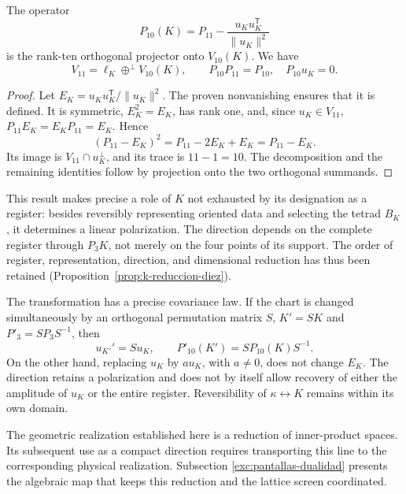 \begin{proposition}
\label{prop:k-reduccion-diez}
The operator
\begin{equation}
 P_{10}(K)=P_{11}
       -\frac{u_Ku_K^{\mathsf T}}{\lVert u_K\rVert^2}
 \label{eq:k-proyector-diez}
\end{equation}
is the rank-ten orthogonal projector onto \(V_{10}(K)\). We have
\[
 V_{11}=\ell_K\mathbin{\oplus^{\perp}}V_{10}(K),
 \qquad P_{10}P_{11}=P_{10},\quad P_{10}u_K=0.
\]
\end{proposition}
\begin{proof}
Let \(E_K=u_Ku_K^{\mathsf T}/\lVert u_K\rVert^2\). The
proven nonvanishing ensures that it is defined. It is symmetric,
\(E_K^2=E_K\), has rank one, and, since \(u_K\in V_{11}\),
\(P_{11}E_K=E_KP_{11}=E_K\). Hence
\[
 (P_{11}-E_K)^2=P_{11}-2E_K+E_K=P_{11}-E_K.
\]
Its image is \(V_{11}\cap u_K^\perp\), and its trace is
\(11-1=10\). The decomposition and the remaining identities
follow by projection onto the two orthogonal summands.
\end{proof}

This result makes precise a role of \(K\) not exhausted by its designation
as a register: besides reversibly representing oriented
data and selecting the tetrad \(B_K\), it determines a
linear polarization. The direction depends on the complete register through
\(P_3K\), not merely on the four points of its support.
The order of register, representation, direction, and dimensional
reduction has thus been retained (Proposition~\ref{prop:k-reduccion-diez}).

The transformation has a precise covariance law. If the chart is changed
simultaneously by an orthogonal permutation matrix \(S\),
\(K'=SK\) and \(P'_3=SP_3S^{-1}\), then
\[
 u_{K'}'=Su_K,\qquad P'_{10}(K')=SP_{10}(K)S^{-1}.
\]
On the other hand, replacing \(u_K\) by \(a u_K\), with \(a\ne0\),
does not change \(E_K\). The direction retains a polarization and does not
by itself allow recovery of either the amplitude of \(u_K\) or the
entire register. Reversibility of \(\kappa\leftrightarrow K\)
remains within its own domain.

The geometric realization established here is a reduction of inner-product
spaces. Its subsequent use as a compact direction requires
transporting this line to the corresponding physical realization.
Subsection \ref{exc:pantallas-dualidad} presents the algebraic map
that keeps this reduction and the lattice screen coordinated.
